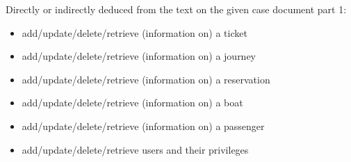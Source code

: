 Directly or indirectly deduced from the text on the given case document part 1:
\begin{itemize}
\item add/update/delete/retrieve (information on) a ticket
\item add/update/delete/retrieve (information on) a journey
\item add/update/delete/retrieve (information on) a reservation
\item add/update/delete/retrieve (information on) a boat
\item add/update/delete/retrieve (information on) a passenger
\item add/update/delete/retrieve users and their privileges\\
\end{itemize}